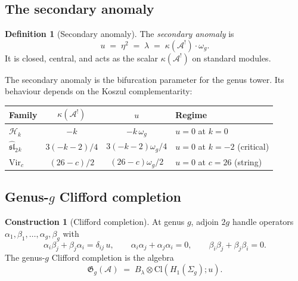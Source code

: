 \documentclass[11pt,reqno]{amsart}
\theoremstyle{definition}
\newtheorem{definition}[theorem]{Definition}
\newtheorem{construction}[theorem]{Construction}
\theoremstyle{remark}
\newcommand{\cA}{\mathcal{A}}
\newcommand{\cH}{\mathcal{H}}
\newcommand{\Vir}{\mathrm{Vir}}
\newcommand{\fsl}{\mathfrak{sl}}
\numberwithin{equation}{section}
\begin{document}
\subsection{The secondary anomaly}\label{subsec:secondary}

\begin{definition}[Secondary anomaly]\label{def:secondary}
The \emph{secondary anomaly} is
\begin{equation}\label{eq:secondary}
u
\;=\;
\eta^2
\;=\;
\lambda
\;=\;
\kappa(\cA^!) \cdot \omega_g.
\end{equation}
It is closed, central, and acts as the scalar $\kappa(\cA^!)$
on standard modules.
\end{definition}

The secondary anomaly is the bifurcation parameter for the genus
tower. Its behaviour depends on the Koszul complementarity:

\begin{center}
\renewcommand{\arraystretch}{1.15}
\begin{tabular}{@{}lccl@{}}
\toprule
Family & $\kappa(\cA^!)$ & $u$ & Regime \\
\midrule
$\cH_k$ & $-k$ & $-k\,\omega_g$ & $u = 0$ at $k = 0$ \\
$\widehat{\fsl}_2{}_k$ & $3(-k-2)/4$ & $3(-k-2)\omega_g/4$ &
  $u = 0$ at $k = -2$ (critical) \\
$\Vir_c$ & $(26-c)/2$ & $(26-c)\omega_g/2$ &
  $u = 0$ at $c = 26$ (string) \\
\bottomrule
\end{tabular}
\end{center}


\subsection{Genus-$g$ Clifford completion}\label{subsec:clifford}

\begin{construction}[Clifford completion]\label{con:clifford}
At genus $g$, adjoin $2g$ handle operators
$\alpha_1, \beta_1, \ldots, \alpha_g, \beta_g$ with
\begin{equation}\label{eq:clifford-rel}
\alpha_i \beta_j + \beta_j \alpha_i = \delta_{ij}\,u,
\qquad
\alpha_i\alpha_j + \alpha_j\alpha_i = 0,
\qquad
\beta_i\beta_j + \beta_j\beta_i = 0.
\end{equation}
The genus-$g$ Clifford completion is the algebra
\begin{equation}\label{eq:clifford-completion}
\mathfrak{G}_g(\cA)
\;=\;
B_\lambda \otimes \mathrm{Cl}(H_1(\Sigma_g); u).
\end{equation}
\end{construction}
\end{document}
